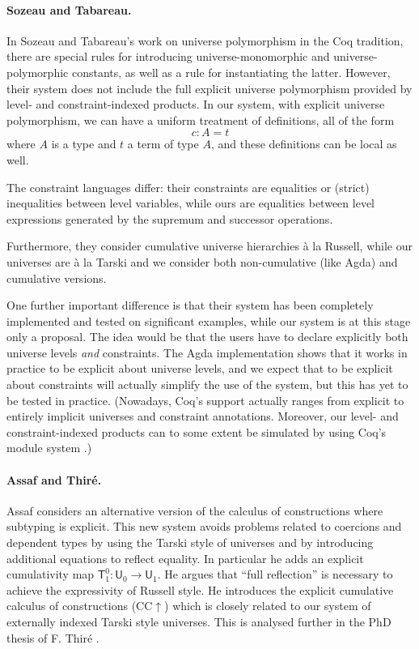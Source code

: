 \documentclass[a4paper,UKenglish,cleveref, autoref, thm-restate]{lipics-v2021}
\newcommand{\UU}{\mathsf{U}}
\newcommand{\T}{\mathsf{T}}
\begin{document}
\paragraph{Sozeau and Tabareau.}

In Sozeau and Tabareau's \cite{SozeauTabareau:coq} work on universe polymorphism in the Coq tradition, there are special rules for introducing universe-monomorphic and universe-polymorphic constants, as well as a rule for instantiating the latter.
However, their system does not include the full explicit universe polymorphism provided by level- and constraint-indexed products.
In our system, with explicit universe polymorphism, we can have a uniform treatment of definitions, all of the form
$$ c : A = t$$
where $A$ is a type and $t$ a term of type $A$, and these definitions can be local as well.

The constraint languages differ: their constraints are equalities or (strict) inequalities between level variables, while ours are equalities between level expressions generated by the supremum and successor operations.

Furthermore, they consider cumulative universe hierarchies  \`a la Russell, 
while our universes are \`a la Tarski and we consider both non-cumulative 
(like Agda) and cumulative versions.

One further important difference is that their system has been completely implemented and tested on
significant examples, while our system is at this stage only a proposal. The idea would be that the
users have to declare explicitly both universe levels {\em and} constraints. The Agda implementation
shows that it works in practice to be explicit about universe levels, and we expect that to be
explicit about constraints will actually simplify the use of the system, but this has yet to be tested in
practice. (Nowadays, Coq’s support actually ranges from explicit to entirely implicit universes and constraint annotations. Moreover, our level- and constraint-indexed products can to some extent be simulated by using Coq's module system
\cite{coq:univpoly}.)

\paragraph{Assaf and Thir\'e.}

Assaf \cite{Assaf14} considers an alternative version of the calculus of
constructions where subtyping is explicit. This new system avoids problems related to coercions and dependent types by using the Tarski style
of universes and by introducing additional equations to reflect equality. In particular he adds an explicit cumulativity map $\T^0_1 : \UU_0 \to \UU_1$. He argues that ``full reflection'' is necessary to achieve the expressivity of Russell style. He introduces the explicit cumulative calculus of constructions (CC$\uparrow$) which is closely related to our system of externally indexed Tarski style universes.
This is analysed further in the PhD thesis of F. Thir\'e \cite{Thire20}.
\end{document}
